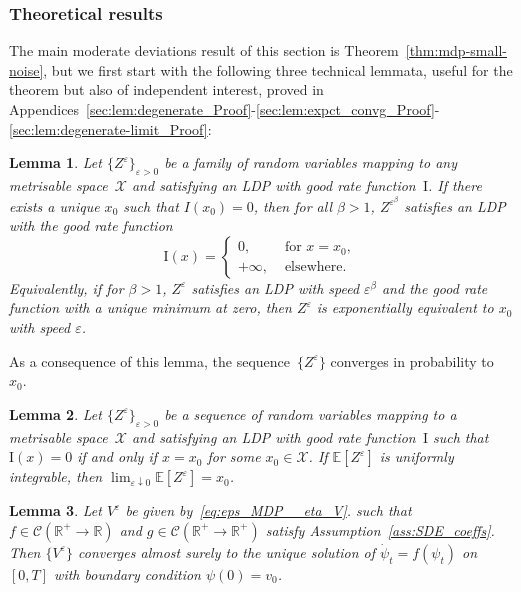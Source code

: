 \documentclass{amsart}[11pt]
\numberwithin{equation}{section}
\numberwithin{theorem}{subsection}
\numberwithin{proposition}{subsection}
\numberwithin{definition}{subsection}
\newtheorem{lemma}{Lemma}
\numberwithin{lemma}{subsection}
\numberwithin{assumption}{subsection}
\newcommand{\Xx}{\mathcal{X}}
\newcommand{\Cc}{\mathcal{C}}
\newcommand{\RR}{\mathbb{R}}
\newcommand{\EE}{\mathbb{E}}
\newcommand{\II}{\mathrm{I}}
\newcommand{\eps}{\varepsilon}
\begin{document}
\subsubsection{Theoretical results}
The main moderate deviations result of this section is Theorem~\ref{thm:mdp-small-noise}, 
but we first start with the following three technical lemmata,
useful for the theorem but also of independent interest, proved in Appendices~\ref{sec:lem:degenerate_Proof}-\ref{sec:lem:expct_convg_Proof}-\ref{sec:lem:degenerate-limit_Proof}:
\begin{lemma}\label{lem:degenerate}
Let $\{Z^{\eps}\}_{\eps>0}$ be a family of random variables mapping to any metrisable space~$\Xx$ and satisfying an LDP with good rate function~$\II$.
If there exists a unique $x_0$ such that $I(x_0) = 0$, 
then for all $\beta > 1$, $Z^{\eps^\beta}$ satisfies an LDP with the good rate function
\[ 
\II(x)=
\begin{cases} 
      0, & \text{ for } x=x_0, \\
      +\infty, & \text{ elsewhere.}
\end{cases}
\]
Equivalently, if for $\beta > 1$, $Z^{\eps}$ satisfies an LDP with speed $\eps^{\beta}$ and the good rate function with a unique minimum at zero, then $Z^{\eps}$ is exponentially equivalent to $x_0$ with speed $\eps$.
\end{lemma}
As a consequence of this lemma, the sequence~$\{Z^{\eps}\}$ converges in probability to~$x_0$. 

\begin{lemma}\label{lem:expct_convg}
Let $\{Z^{\eps}\}_{\eps>0}$ be a sequence of random variables mapping to a metrisable space~$\Xx$ and satisfying an LDP with good rate function~$\II$ such that $\II(x)=0$ if and only if $x = x_0$ for some $x_0 \in\Xx$. 
If $\EE[Z^{\eps}]$ is uniformly integrable, then $\lim_{\eps\downarrow 0}\EE[Z^{\eps}] = x_0$.
\end{lemma}

\begin{lemma}\label{lem:degenerate-limit}
Let $V^{\eps}$ be given by~\eqref{eq:eps_MDP__eta_V}.
such that $f\in\Cc(\RR^+\to \RR)$ and $g\in\Cc(\RR^+\to \RR^+)$ satisfy Assumption~\ref{ass:SDE_coeffs}. Then $\{V^{\eps}\}$ converges almost surely to the unique solution of $\dot{\psi}_t = f(\psi_t)$ on $[0,T]$ with boundary condition $\psi(0) = v_0$.
\end{lemma}

\end{document}
